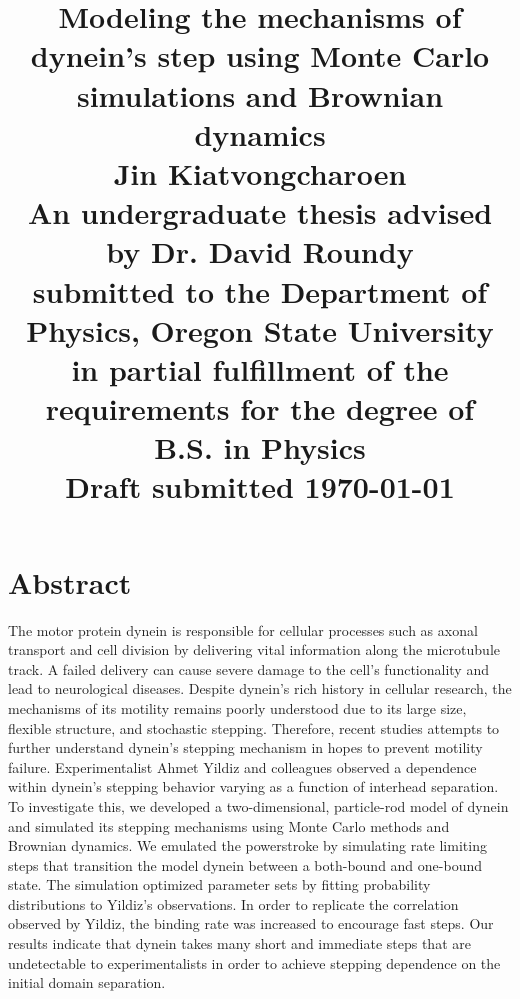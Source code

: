 \documentclass[12pt]{report}
\title{
	\Huge{Modeling the mechanisms of dynein's step using Monte Carlo simulations and Brownian dynamics}\vspace{1em}\\
	\Large{Jin Kiatvongcharoen} \vspace{0.5em}\\[2in] 
	\normalsize{An undergraduate thesis advised by Dr. David Roundy}\\
	\normalsize{submitted to the Department of Physics, Oregon State University}\\%
	\normalsize{in partial fulfillment of the requirements for the degree of}\\
	\normalsize{B.S. in Physics}\vspace{1.5 em}\\
	\normalsize{Draft submitted \today}\\


}
\date{}
\begin{document}
    \maketitle
    \onehalfspacing


	\chapter*{Abstract}
	The motor protein dynein is responsible for cellular processes such as axonal transport and cell division by delivering vital information along the microtubule track. A failed delivery can cause severe damage to the cell’s functionality and lead to neurological diseases. Despite dynein's rich history in cellular research, the mechanisms of its motility remains poorly understood due to its large size, flexible structure, and stochastic stepping. Therefore, recent studies attempts to further understand dynein's stepping mechanism in hopes to prevent motility failure. Experimentalist Ahmet Yildiz and colleagues observed a dependence within dynein's stepping behavior varying as a function of interhead separation. To investigate this, we developed a two-dimensional, particle-rod model of dynein and simulated its stepping mechanisms using Monte Carlo methods and Brownian dynamics. We emulated the powerstroke by simulating rate limiting steps that transition the model dynein between a both-bound and one-bound state. The simulation optimized parameter sets by fitting probability distributions to Yildiz's observations. In order to replicate the correlation observed by Yildiz, the binding rate was increased to encourage fast steps. Our results indicate that dynein takes many short and immediate steps that are undetectable to experimentalists in order to achieve stepping dependence on the initial domain separation. 
%	
%	
	
\end{document}
